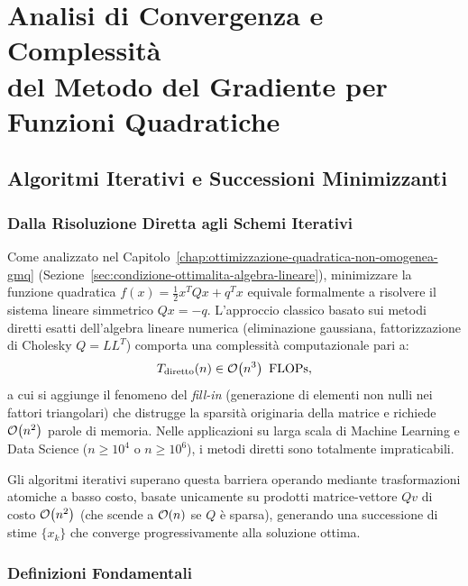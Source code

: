 \chapter[Analisi di Convergenza e Complessit\`a del Metodo del Gradiente]{Analisi di Convergenza e Complessit\`a\\del Metodo del Gradiente per Funzioni Quadratiche}
\label{chap:convergenza-complessita-gradiente-quadratiche}

\FloatBarrier
\section{Algoritmi Iterativi e Successioni Minimizzanti}
\label{sec:algoritmi-iterativi-minimizzanti}

\subsection{Dalla Risoluzione Diretta agli Schemi Iterativi}
Come analizzato nel Capitolo~\ref{chap:ottimizzazione-quadratica-non-omogenea-gmq} (Sezione~\ref{sec:condizione-ottimalita-algebra-lineare}), minimizzare la funzione quadratica $f(x) = \frac{1}{2} x^T Q x + q^T x$ equivale formalmente a risolvere il sistema lineare simmetrico $Q x = -q$. L'approccio classico basato sui metodi diretti esatti dell'algebra lineare numerica (eliminazione gaussiana, fattorizzazione di Cholesky $Q = L L^T$) comporta una complessit\`a computazionale pari a:
\begin{equation}
    T_{\text{diretto}}(n) \in \mathcal{O}\!\left(n^3\right) \text{ FLOPs},
\end{equation}
a cui si aggiunge il fenomeno del \textit{fill-in} (generazione di elementi non nulli nei fattori triangolari) che distrugge la sparsit\`a originaria della matrice e richiede $\mathcal{O}\!\left(n^2\right)$ parole di memoria. Nelle applicazioni su larga scala di Machine Learning e Data Science ($n \ge 10^4$ o $n \ge 10^6$), i metodi diretti sono totalmente impraticabili.

Gli algoritmi iterativi superano questa barriera operando mediante trasformazioni atomiche a basso costo, basate unicamente su prodotti matrice-vettore $Q v$ di costo $\mathcal{O}\!\left(n^2\right)$ (che scende a $\mathcal{O}\!\left(n\right)$ se $Q$ \`e sparsa), generando una successione di stime $\{x_k\}$ che converge progressivamente alla soluzione ottima.

\subsection{Definizioni Fondamentali}

